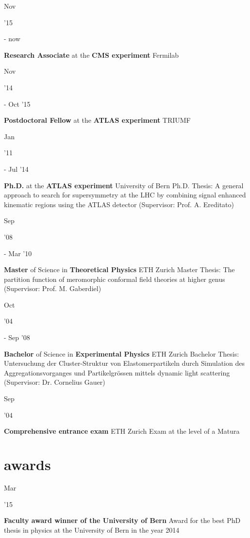 \documentclass[]{cv} %
\begin{document}
\begin{entrylist}
  \entry
  {\parbox[t]{\parboxWidthOne}{Nov}\parbox[t]{\parboxWidthTwo}{\hfill '15} - now}
  {\textbf{Research Associate} at the \textbf{CMS experiment}}
  {Fermilab}
  {}
  \entry
  {\parbox[t]{\parboxWidthOne}{Nov}\parbox[t]{\parboxWidthTwo}{\hfill '14} - Oct '15}
  {\textbf{Postdoctoral Fellow} at the \textbf{ATLAS experiment}}
  {TRIUMF}
  {}
  \entry
  {\parbox[t]{\parboxWidthOne}{Jan}\parbox[t]{\parboxWidthTwo}{\hfill '11} - Jul '14}
  {\textbf{Ph.D.} at the \textbf{ATLAS experiment}}
  {University of Bern}
  {Ph.D. Thesis: A general approach to search for supersymmetry at the LHC by combining signal enhanced kinematic regions using the ATLAS detector (Supervisor:
  Prof. A. Ereditato)}
  \entry
  {\parbox[t]{\parboxWidthOne}{Sep}\parbox[t]{\parboxWidthTwo}{\hfill '08} - Mar '10}
  {\textbf{Master} of Science in \textbf{Theoretical Physics}}
  {ETH Zurich}
  {Master Thesis: The partition function of meromorphic conformal field theories at higher genus (Supervisor: Prof. M. Gaberdiel)}
  \entry
  {\parbox[t]{\parboxWidthOne}{Oct}\parbox[t]{\parboxWidthTwo}{\hfill '04} - Sep '08}
  {\textbf{Bachelor} of Science in \textbf{Experimental Physics}}
  {ETH Zurich}
  {Bachelor Thesis: Untersuchung der Cluster-Struktur von Elastomerpartikeln durch Simulation des Aggregationsvorganges und Partikelgr{\"o}ssen mittels dynamic
light scattering (Supervisor: Dr. Cornelius Gauer)}
\entry
{\parbox[t]{\parboxWidthOne}{Sep}\parbox[t]{\parboxWidthTwo}{\hfill '04}}
{\textbf{Comprehensive entrance exam}}
{ETH Zurich}
{Exam at the level of a Matura}
\end{entrylist}

\section{awards}

\begin{entrylist}

  \entry
  {\parbox[t]{\parboxWidthOne}{Mar} '15}
  {\textbf{Faculty award winner of the University of Bern}}
  {}
  {Award for the best PhD thesis in physics at the University of Bern in the
  year 2014}

\end{entrylist}
\end{document}
